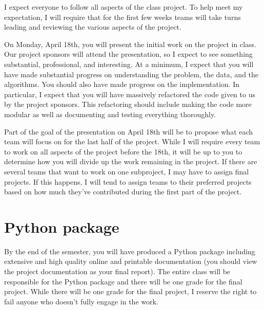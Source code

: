 \documentclass[11pt, oneside]{article}   	%
\begin{document}
I expect everyone to follow all aspects of the class project.  To help
meet my expectation, I will require that for the first few weeks teams
will take turns leading and reviewing the various aspects of the project.

On Monday, April 18th, you will present the initial work on the project in
class.  Our project sponsors will attend the presentation, so I expect to see
something substantial, professional, and interesting.  At a minimum, I expect
that you will have made substantial progress on understanding the problem, the
data, and the algorithms.  You should also have made progress on the
implementation.  In particular, I expect that you will have massively
refactored the code given to us by the project sponsors.  This refactoring
should include making the code more modular as well as documenting and testing
everything thoroughly.

Part of the goal of the presentation on April 18th will be to propose what each
team will focus on for the last half of the project.  While I will require
every team to work on all aspects of the project before the 18th, it will be up
to you to determine how you will divide up the work remaining in the project.
If there are several teams that want to work on one subproject, I may have to
assign final projects.  If this happens, I will tend to assign teams to their
preferred projects based on how much they've contributed during the first part
of the project.


\section{Python package}

By the end of the semester, you will have produced a Python package including
extensive and high quality online and printable documentation (you should view
the project documentation as your final report).  The entire class will be
responsible for the Python package and there will be one grade for the final
project.  While there will be one grade for the final project, I reserve the
right to fail anyone who doesn't fully engage in the work.
\end{document}
